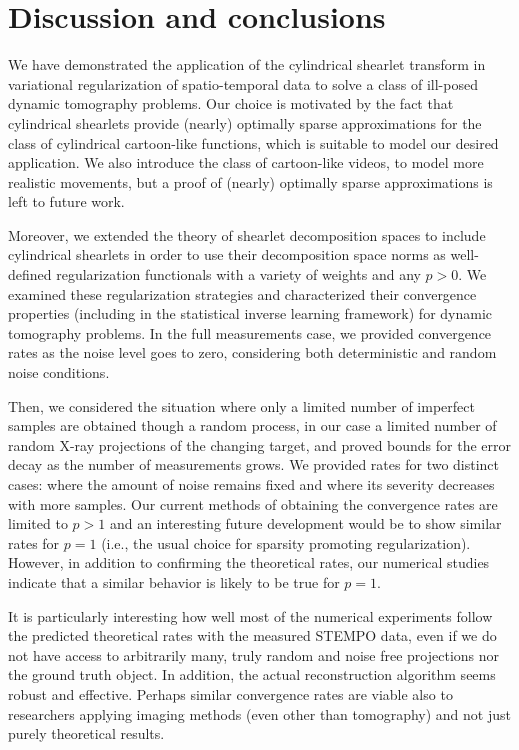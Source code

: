 \documentclass[11pt,a4paper]{article}
\numberwithin{equation}{section}
\begin{document}
\section{Discussion and conclusions} \label{sec:conclusions}
We have demonstrated the application of the cylindrical shearlet transform in variational regularization of spatio-temporal data to solve a class of ill-posed dynamic tomography problems. Our choice is motivated by the %
fact that cylindrical shearlets provide (nearly) optimally sparse approximations for the class of cylindrical cartoon-like functions, which is suitable to model our desired application. 
We also introduce the class of cartoon-like videos, to model more realistic movements, but a proof of (nearly) optimally sparse approximations is left to future work.

Moreover, we extended the theory of shearlet decomposition spaces to include cylindrical shearlets in order to use their decomposition space norms as well-defined regularization functionals with a variety of weights and any $p > 0$.
We examined these regularization strategies and characterized their convergence properties (including  in the statistical inverse learning framework) for dynamic tomography problems. In the full measurements case, we provided convergence rates as the noise level goes to zero, considering both deterministic and random noise conditions.

Then, we considered the situation where only a limited number of imperfect samples are obtained though a random process, in our case a limited number of random X-ray projections of the changing target, and proved bounds for the error decay as the number of measurements grows. We provided rates for two distinct cases: where the amount of noise remains fixed and where its severity decreases with more samples. Our current methods of obtaining the convergence rates are limited to $p > 1$ and an interesting future development would be to show similar rates for $p = 1$ (i.e., the usual choice for sparsity promoting regularization). However, in addition to confirming the theoretical rates, our numerical studies indicate that a similar behavior is likely to be true for $p = 1$.

It is particularly interesting how well most of the numerical experiments follow the predicted theoretical rates with the measured STEMPO data, even if we do not have access to arbitrarily many, truly random and noise free projections nor the ground truth object. In addition, the actual reconstruction algorithm seems robust and effective. Perhaps similar convergence rates are viable also to researchers applying imaging methods (even other than tomography) and not just purely theoretical results.
\end{document}
